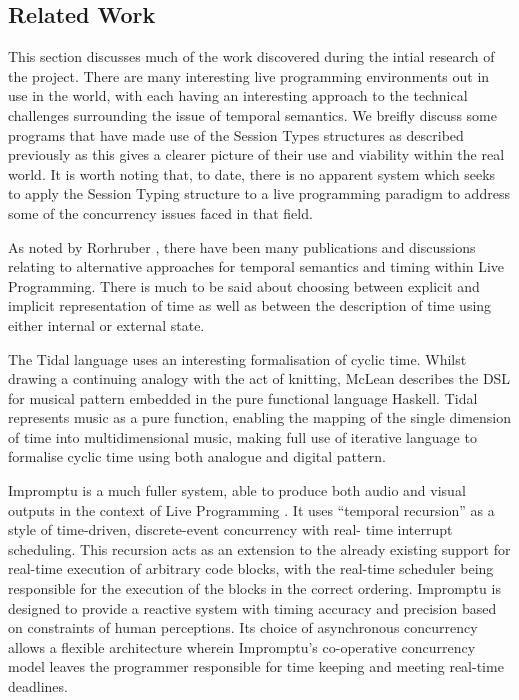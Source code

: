 \documentclass[11pt]{scrartcl}
\begin{document}

\subsection{Related Work}


This section discusses much of the work discovered during the intial research 
of the project. There are many interesting live programming environments out 
in use in the world, with each having an interesting approach to the technical 
challenges surrounding the issue of temporal semantics. We breifly discuss 
some programs that have made use of the Session Types structures as described 
previously as this gives a clearer picture of their use and viability within 
the real world. It is worth noting that, to date, there is no apparent system 
which seeks to apply the Session Typing structure to a live programming 
paradigm to address some of the concurrency issues faced in that field.

As noted by Rorhruber \cite{BMNR14}, there have been many publications and 
discussions relating to alternative approaches for temporal semantics and 
timing within Live Programming. There is much to be said about choosing 
between explicit and implicit representation of time as well as between the 
description of time using either internal or external state.

The Tidal language \cite{McL13} uses an interesting formalisation of cyclic 
time. Whilst drawing a continuing analogy with the act of knitting, McLean 
describes the DSL for musical pattern embedded in the pure functional language 
Haskell. Tidal represents music as a pure function, enabling the mapping of 
the single dimension of time into multidimensional music, making full use of 
iterative language to formalise cyclic time using both analogue and digital 
pattern.

Impromptu is a much fuller system, able to produce both audio and visual 
outputs in the context of Live Programming \cite{SG10}. It uses ``temporal 
recursion'' as a style of time-driven, discrete-event concurrency with real-
time interrupt scheduling. This recursion acts as an extension to the already 
existing support for real-time execution of arbitrary code blocks, with the 
real-time scheduler being responsible for the execution of the blocks in the 
correct ordering. Impromptu is designed to provide a reactive system with 
timing accuracy and precision based on constraints of human perceptions. Its 
choice of asynchronous concurrency allows a flexible architecture wherein 
Impromptu's co-operative concurrency model leaves the programmer responsible 
for time keeping and meeting real-time deadlines.
\end{document}
